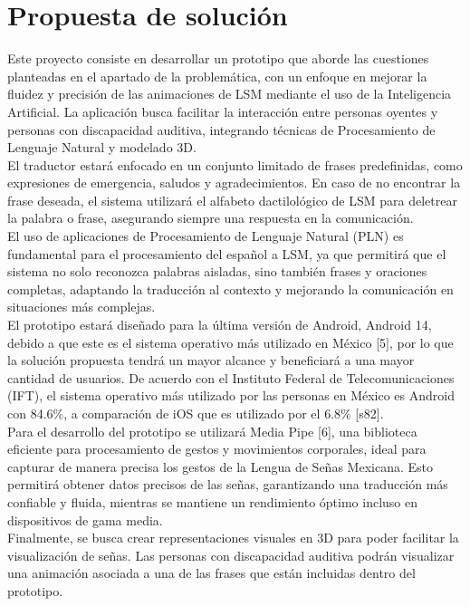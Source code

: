 \newpage
\section{Propuesta de solución}
Este proyecto consiste en desarrollar un prototipo que aborde las cuestiones planteadas en el apartado de la problemática, con un enfoque en mejorar la fluidez y precisión de las animaciones de LSM mediante el uso de la Inteligencia Artificial. La aplicación busca facilitar la interacción entre personas oyentes y personas con discapacidad auditiva, integrando técnicas de Procesamiento de Lenguaje Natural y modelado 3D.\\

El traductor estará enfocado en un conjunto limitado de frases predefinidas, como expresiones de emergencia, saludos y agradecimientos. En caso de no encontrar la frase deseada, el sistema utilizará el alfabeto dactilológico de LSM para deletrear la palabra o frase, asegurando siempre una respuesta en la comunicación.\\

El uso de aplicaciones de Procesamiento de Lenguaje Natural (PLN) es fundamental para el procesamiento del español a LSM, ya que permitirá que el sistema no solo reconozca palabras aisladas, sino también frases y oraciones completas, adaptando la traducción al contexto y mejorando la comunicación en situaciones más complejas.\\

El prototipo estará diseñado para la última versión de Android, Android 14, debido a que este es el sistema operativo más utilizado en México [5], por lo que la solución propuesta tendrá un mayor alcance y beneficiará a una mayor cantidad de usuarios. De acuerdo con el Instituto Federal de Telecomunicaciones (IFT), el sistema operativo más utilizado por las personas en México es Android con 84.6\%, a comparación de iOS que es utilizado por el 6.8\% [s82].\\

Para el desarrollo del prototipo se utilizará Media Pipe [6], una biblioteca eficiente para procesamiento de gestos y movimientos corporales, ideal para capturar de manera precisa los gestos de la Lengua de Señas Mexicana. Esto permitirá obtener datos precisos de las señas, garantizando una traducción más confiable y fluida, mientras se mantiene un rendimiento óptimo incluso en dispositivos de gama media.\\

Finalmente, se busca crear representaciones visuales en 3D para poder facilitar la visualización de señas. Las personas con discapacidad auditiva podrán visualizar una animación asociada a una de las frases que están incluidas dentro del prototipo.
\newpage

